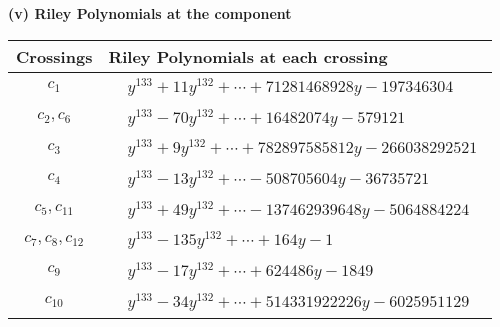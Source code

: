 \documentclass[1p]{elsarticle_modified}
\theoremstyle{definition}
\begin{document}
\newpage\renewcommand{\arraystretch}{1}
\flushleft \textbf{(v) Riley Polynomials at the component}\newline \\
\begin{tabular}{m{50pt}|m{274pt}}
Crossings & \hspace{64pt}Riley Polynomials at each crossing \\
\hline $$\begin{aligned}c_{1}\end{aligned}$$&$\begin{aligned}
&y^{133}+11 y^{132}+\cdots+71281468928 y-197346304
\end{aligned}$\\
\hline $$\begin{aligned}c_{2},c_{6}\end{aligned}$$&$\begin{aligned}
&y^{133}-70 y^{132}+\cdots+16482074 y-579121
\end{aligned}$\\
\hline $$\begin{aligned}c_{3}\end{aligned}$$&$\begin{aligned}
&y^{133}+9 y^{132}+\cdots+782897585812 y-266038292521
\end{aligned}$\\
\hline $$\begin{aligned}c_{4}\end{aligned}$$&$\begin{aligned}
&y^{133}-13 y^{132}+\cdots-508705604 y-36735721
\end{aligned}$\\
\hline $$\begin{aligned}c_{5},c_{11}\end{aligned}$$&$\begin{aligned}
&y^{133}+49 y^{132}+\cdots-137462939648 y-5064884224
\end{aligned}$\\
\hline $$\begin{aligned}c_{7},c_{8},c_{12}\end{aligned}$$&$\begin{aligned}
&y^{133}-135 y^{132}+\cdots+164 y-1
\end{aligned}$\\
\hline $$\begin{aligned}c_{9}\end{aligned}$$&$\begin{aligned}
&y^{133}-17 y^{132}+\cdots+624486 y-1849
\end{aligned}$\\
\hline $$\begin{aligned}c_{10}\end{aligned}$$&$\begin{aligned}
&y^{133}-34 y^{132}+\cdots+514331922226 y-6025951129
\end{aligned}$\\
\hline
\end{tabular}\\~\\
\end{document}
